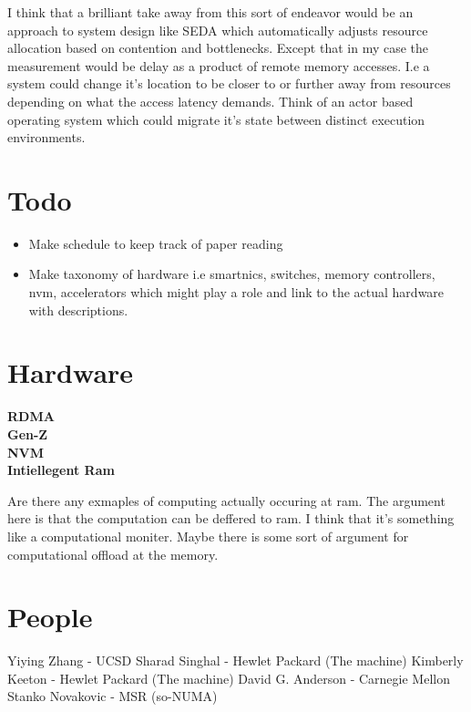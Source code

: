 I think that a brilliant take away from this sort of endeavor would be an
approach to system design like SEDA which automatically adjusts resource
allocation based on contention and bottlenecks. Except that in my case the
measurement would be delay as a product of remote memory accesses. I.e a
system could change it's location to be closer to or further away from
resources depending on what the access latency demands. Think of an actor
based operating system which could migrate it's state between distinct
execution environments.

\section{Todo} 
\label{sec:todo}
\begin{itemize} 

     \item{Make schedule to keep track of paper reading}

    \item {Make taxonomy of hardware i.e smartnics, switches, memory
    controllers, nvm, accelerators which might play a role and link to the
    actual hardware with descriptions.}

\end{itemize}

\section{Hardware}

\textbf{RDMA}
\\
\textbf{Gen-Z}
\\
\textbf{NVM}
\\
\textbf{Intiellegent Ram}

Are there any exmaples of computing actually occuring at ram. The argument
here is that the computation can be deffered to ram. I think that it's
something like a computational moniter. Maybe there is some sort of argument
for computational offload at the memory.



\section{People}

Yiying Zhang - UCSD
Sharad Singhal - Hewlet Packard (The machine)
Kimberly Keeton - Hewlet Packard (The machine)
David G. Anderson - Carnegie Mellon
Stanko Novakovic - MSR (so-NUMA)
